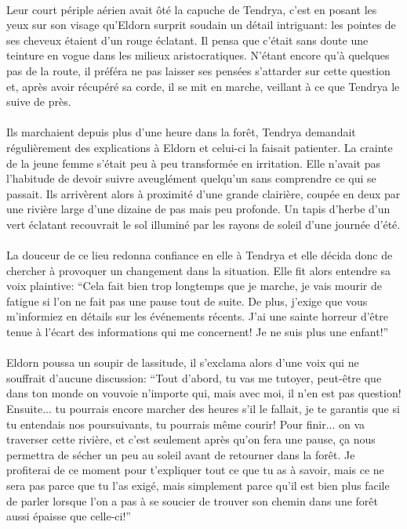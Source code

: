 \paragraph{}
Leur court périple aérien avait ôté la capuche de Tendrya, c'est en posant
les yeux sur son visage qu'Eldorn surprit soudain un détail intriguant:
les pointes de ses cheveux étaient d'un rouge éclatant. Il pensa que c'était
sans doute une teinture en vogue dans les milieux aristocratiques. N'étant
encore qu'à quelques pas de la route, il préféra ne pas laisser ses pensées
s'attarder sur cette question et, après avoir récupéré sa corde, il se mit en
marche, veillant à ce que Tendrya le suive de près.

\contextswitch

\paragraph{}
Ils marchaient depuis plus d'une heure dans la forêt, Tendrya demandait
régulièrement des explications à Eldorn et celui-ci la faisait patienter. La
crainte de la jeune femme s'était peu à peu transformée en irritation. Elle
n'avait pas l'habitude de devoir suivre aveuglément quelqu'un sans comprendre
ce qui se passait. Ils arrivèrent alors à proximité d'une grande clairière,
coupée en deux par une rivière large d'une dizaine de pas mais peu profonde.
Un tapis d'herbe d'un vert éclatant recouvrait le sol illuminé par les rayons
de soleil d'une journée d'été.

\paragraph{}
La douceur de ce lieu redonna confiance en elle à Tendrya et elle décida donc
de chercher à provoquer un changement dans la situation. Elle fit alors
entendre sa voix plaintive: ``Cela fait bien trop longtemps que je marche, je
vais mourir de fatigue si l'on ne fait pas une pause tout de suite. De plus,
j'exige que vous m'informiez en détails sur les événements récents. J'ai une
sainte horreur d'être tenue à l'écart des informations qui me concernent! Je
ne suis plus une enfant!''

\paragraph{}
Eldorn poussa un soupir de lassitude, il s'exclama alors d'une voix qui ne
souffrait d'aucune discussion: ``Tout d'abord, tu vas me tutoyer, peut-être
que dans ton monde on vouvoie n'importe qui, mais avec moi, il n'en est pas
question! Ensuite... tu pourrais encore marcher des heures s'il le fallait, je
te garantis que si tu entendais nos poursuivants, tu pourrais même courir!
Pour finir... on va traverser cette rivière, et c'est seulement après qu'on
fera une pause, ça nous permettra de sécher un peu au soleil avant de
retourner dans la forêt. Je profiterai de ce moment pour t'expliquer tout ce
que tu as à savoir, mais ce ne sera pas parce que tu l'as exigé, mais
simplement parce qu'il est bien plus facile de parler lorsque l'on a pas à se
soucier de trouver son chemin dans une forêt aussi épaisse que celle-ci!''

